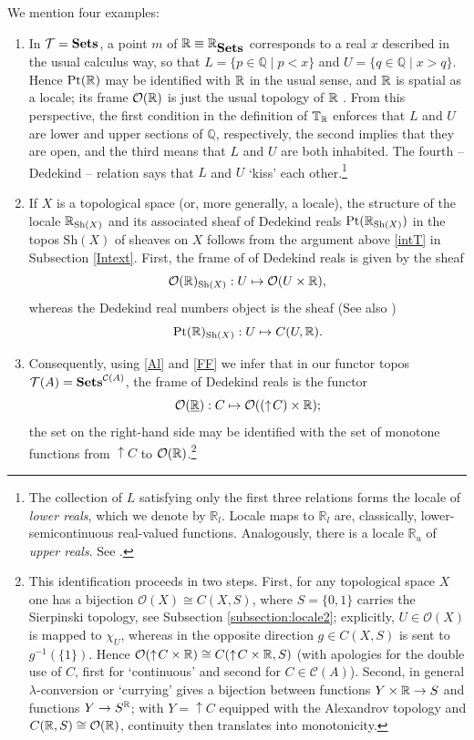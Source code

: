 \documentclass[11pt]{article}
\newcommand{\Q}{\mathbb{Q}}
\newcommand{\beq}{\begin{equation}}
\newcommand{\eeq}{\end{equation}}
\newcommand{\Sets}{\mbox{\textbf{Sets}}}
\newcommand{\raw}{\rightarrow} \newcommand{\rat}{\mapsto}
\newcommand{\x}{\times} \newcommand{\hb}{\hbar}
\newcommand{\er}{\eqref}
\newcommand{\CA}{{\mathcal A}} \newcommand{\CB}{{\mathcal B}}
\newcommand{\CO}{{\mathcal O}} \newcommand{\CP}{{\mathcal P}}
\newcommand{\CT}{{\mathcal T}} \newcommand{\CV}{{\mathcal V}}
\newcommand{\T}{{\mathbb T}} \newcommand{\Z}{{\mathbb Z}}
\newcommand{\alg}[1]{\ensuremath{#1}}
\newcommand{\Sh}{\ensuremath{\mathrm{Sh}}}
\newcommand{\context}{\ensuremath{\mathcal{C}}}
\newcommand{\asstopos}{\ensuremath{\mathcal{T}}}
\newcommand{\field}[1]{\ensuremath{\mathbb{#1}}}
\renewcommand{\CA}{\mathcal{C}(A)}
\newcommand{\TA}{\mathcal{T}(A)}
\renewcommand{\TA}{\asstopos(\alg{A})}
\renewcommand{\CA}{\context(\alg{A})}
\begin{document}
We mention four examples:
\begin{enumerate}
  \item In $\CT= \Sets$, 
   a point $m$ of $\R\equiv \R_{\Sets}$ corresponds to a real
    $x$ described in the usual calculus way, so that $L= \{p\in\Q\mid
    p<x\}$ and $U=\{q\in\Q\mid x>q\}$. Hence  $\mathrm{Pt}({\mathbb R})$ may
    be identified with ${\mathbb R}$ in the usual sense, and ${\mathbb R}$ is spatial
    as a locale; its frame  $\CO(\R)$ is just the usual topology of ${\mathbb R}$
        \cite[D4.7.4]{johnstone02b}.
    From this perspective, the first
    condition in the definition of $\T_{\R}$  enforces that $L$ and $U$ are lower and upper
    sections of $\Q$, respectively, the second implies that they are
    open, and the third means that $L$ and $U$ are both inhabited. The fourth -- Dedekind --
    relation says that $L$ and $U$ `kiss' each other.\footnote{The collection of $L$ satisfying only the first three relations
    forms the locale of \emph{lower reals}, which we denote by
    $\field{R}_l$. Locale maps to $\field{R}_l$ are, classically,
    lower-semicontinuous real-valued functions. Analogously, there is
    a locale $\field{R}_u$ of \emph{upper reals}. See \cite{johnstone02b}.}

  \item If $X$ is a topological space (or, more generally, a locale), the structure of the locale
  $\R_{\Sh(X)}$ and its associated sheaf of Dedekind reals $\mathrm{Pt}(\R_{\Sh(X)})$
     in the topos $\Sh(X)$ of
    sheaves on $X$ follows from the argument above \er{intT} in Subsection \ref{Intext}.
    First, the frame of of Dedekind reals is given by the sheaf
\beq \CO(\R)_{\Sh(X)}: U\mapsto \CO(U\x \R),\eeq
whereas the Dedekind real numbers object is the sheaf (See also \cite{maclanemoerdijk92})
\beq \mathrm{Pt}(\R)_{\Sh(X)}: U\mapsto C(U,\R).\label{DRN}\eeq
 \item
 Consequently, using \er{Al} and \er{FF} we infer that
    in our functor topos  $\TA=\Sets^{\CA}$,   the frame  of Dedekind reals is the functor
    \beq
    \CO(\underline{\R}):
    C\mapsto \CO((\uparrow\! C)\x \R); \label{ddr}\eeq
   the set on the right-hand side may be identified with the set of monotone functions from $\uparrow\! C$ to $\CO(\R)$.\footnote{\label{monotone} This identification proceeds in two steps. First, for any topological space $X$ one has a bijection $\CO(X)\cong C(X, S)$, where $S=\{0,1\}$ carries the Sierpinski topology, see Subsection \ref{subsection:locale2}; explicitly,
 $U\in\CO(X)$ is mapped to  $\chi_U$, whereas in the opposite direction $g\in C(X, S)$
   is sent to  $g^{-1}(\{1\})$.
Hence $\CO(\uparrow\!C \x \R) \cong C(\uparrow\!C \x \R, S)$ (with apologies for the double use of $C$, first for `continuous' and second for $C\in\CA$). Second, in general $\lambda$-conversion or `currying' gives a  bijection between functions $Y \x \R\raw S$ and  functions 
$Y\raw S^{\R}$; with $Y=\uparrow\!C$ equipped with the Alexandrov topology and $C(\R,S)\cong \CO(\R)$,  continuity then translates into monotonicity.}
    

\end{enumerate}
\end{document}
